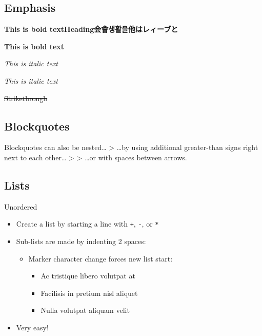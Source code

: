 \documentclass[
  paper=a4,
  ,captions=tableheading
]{scrartcl}
\renewcommand{\st}[1]{\sout{#1}}
\providecommand{\tightlist}{%
  \setlength{\itemsep}{0pt}\setlength{\parskip}{0pt}}
\renewenvironment{quote}{\begin{customblockquote}\list{}{\rightmargin=0em\leftmargin=0em}%
\item\relax\color{blockquote-text}\ignorespaces}{\unskip\unskip\endlist\end{customblockquote}}
\begin{document}
\hypertarget{emphasis}{%
\subsection{Emphasis}\label{emphasis}}

\textbf{This is bold textHeading会會생활을他はレィーブと}

\textbf{This is bold text}

\emph{This is italic text}

\emph{This is italic text}

\st{Strikethrough}

\hypertarget{blockquotes}{%
\subsection{Blockquotes}\label{blockquotes}}

\begin{quote}
Blockquotes can also be nested\ldots{} \textgreater{} \ldots by using
additional greater-than signs right next to each other\ldots{}
\textgreater{} \textgreater{} \ldots or with spaces between arrows.
\end{quote}

\hypertarget{lists}{%
\subsection{Lists}\label{lists}}

Unordered

\begin{itemize}
\tightlist
\item
  Create a list by starting a line with
  \colorbox{inlinecode-bgcolor}{\lstinline{+}},
  \colorbox{inlinecode-bgcolor}{\lstinline{-}}, or
  \colorbox{inlinecode-bgcolor}{\lstinline{*}}
\item
  Sub-lists are made by indenting 2 spaces:

  \begin{itemize}
  \tightlist
  \item
    Marker character change forces new list start:

    \begin{itemize}
    \tightlist
    \item
      Ac tristique libero volutpat at
    \item
      Facilisis in pretium nisl aliquet
    \item
      Nulla volutpat aliquam velit
    \end{itemize}
  \end{itemize}
\item
  Very easy!
\end{itemize}
\end{document}
